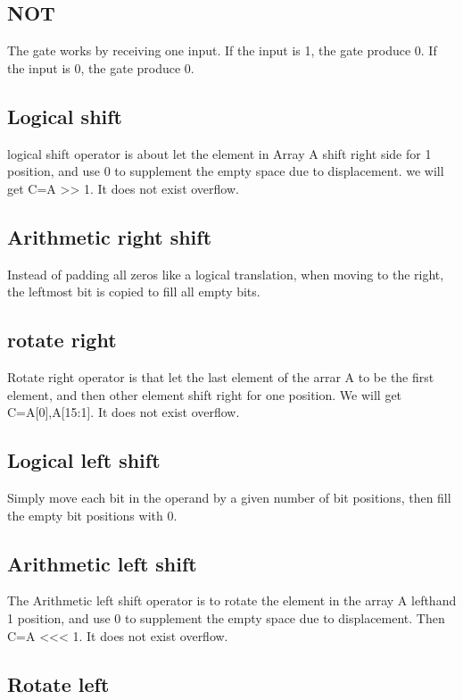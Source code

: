 \documentclass[12pt,a4paper]{article}
\begin{document}
\subsection{NOT}

The gate works by receiving one input. If the input is 1, the gate produce 0. If the input is 0, the gate produce 0.

\subsection{Logical shift}

logical shift operator is about let the element in Array A shift right side for 1 position, and use 0 to supplement the empty space due to displacement.
we will get C=A >> 1.
It does not exist overflow.

\subsection{Arithmetic right shift}

Instead of padding all zeros like a logical translation, when moving to the right, the leftmost bit is copied to fill all empty bits.

\subsection{rotate right}

Rotate right operator is that let the last element of the arrar A to be the first element, and then other element shift right for one position.
We will get C={A[0],A[15:1]}.
It does not exist overflow.

\subsection{Logical left shift}

Simply move each bit in the operand by a given number of bit positions, then fill the empty bit positions with 0.

\subsection{Arithmetic left shift}

The Arithmetic left shift operator is to rotate the element in the array A lefthand 1 position, and use 0 to supplement the empty space due to displacement.
Then C=A <<< 1.
It does not exist overflow.

\subsection{Rotate left}
\end{document}
